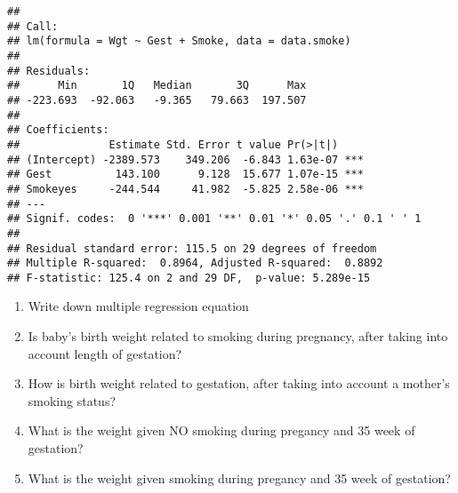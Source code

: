 \documentclass[12pt]{article}\usepackage[]{graphicx}\usepackage[]{color}
\makeatletter
\newenvironment{kframe}{%
 \def\at@end@of@kframe{}%
 \ifinner\ifhmode%
  \def\at@end@of@kframe{\end{minipage}}%
  \begin{minipage}{\columnwidth}%
 \fi\fi%
 \def\FrameCommand##1{\hskip\@totalleftmargin \hskip-\fboxsep
 \colorbox{shadecolor}{##1}\hskip-\fboxsep
     \hskip-\linewidth \hskip-\@totalleftmargin \hskip\columnwidth}%
 \MakeFramed {\advance\hsize-\width
   \@totalleftmargin\z@ \linewidth\hsize
   \@setminipage}}%
 {\par\unskip\endMakeFramed%
 \at@end@of@kframe}
\newenvironment{knitrout}{}{} %
\makeatother
\begin{document}
\begin{knitrout}
\color{fgcolor}\begin{kframe}
\begin{verbatim}
## 
## Call:
## lm(formula = Wgt ~ Gest + Smoke, data = data.smoke)
## 
## Residuals:
##      Min       1Q   Median       3Q      Max 
## -223.693  -92.063   -9.365   79.663  197.507 
## 
## Coefficients:
##              Estimate Std. Error t value Pr(>|t|)    
## (Intercept) -2389.573    349.206  -6.843 1.63e-07 ***
## Gest          143.100      9.128  15.677 1.07e-15 ***
## Smokeyes     -244.544     41.982  -5.825 2.58e-06 ***
## ---
## Signif. codes:  0 '***' 0.001 '**' 0.01 '*' 0.05 '.' 0.1 ' ' 1
## 
## Residual standard error: 115.5 on 29 degrees of freedom
## Multiple R-squared:  0.8964,	Adjusted R-squared:  0.8892 
## F-statistic: 125.4 on 2 and 29 DF,  p-value: 5.289e-15
\end{verbatim}
\end{kframe}
\end{knitrout}

\begin{enumerate}
  \item Write down multiple regression equation
  \item Is baby's birth weight related to smoking during pregnancy, after taking into account length of gestation?
  \item How is birth weight related to gestation, after taking into account a mother's smoking status? 
  \item What is the weight given NO smoking during pregancy and 35 week of gestation?
  \item What is the weight given smoking during pregancy and 35 week of gestation?
\end{enumerate}
\end{document}
